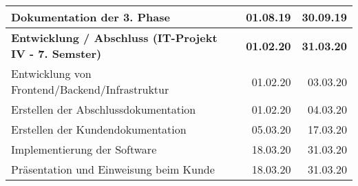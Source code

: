 \begin{table}[htp]
\begin{tabular}{|l|r|r|}
    Dokumentation der 3. Phase                                    & 01.08.19          & 30.09.19 \\ \hline
    \textbf{Entwicklung / Abschluss (IT-Projekt IV - 7. Semster)} & \textbf{01.02.20} & \textbf{31.03.20} \\ \hline
    Entwicklung von Frontend/Backend/Infrastruktur                & 01.02.20          & 03.03.20 \\ \hline
    Erstellen der Abschlussdokumentation                          & 01.02.20          & 04.03.20 \\ \hline
    Erstellen der Kundendokumentation                             & 05.03.20          & 17.03.20 \\ \hline
    Implementierung der Software                                  & 18.03.20          & 31.03.20 \\ \hline
    Präsentation und Einweisung beim Kunde                        & 18.03.20          & 31.03.20 \\ \hline
  \end{tabular}
  \egroup
  \label{tab:zeitplanung}
\end{table}

\newpage
